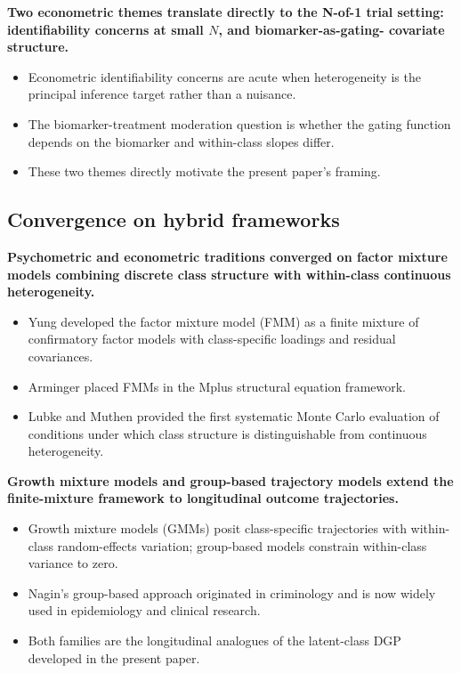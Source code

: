 \documentclass[
  11pt,
]{article}
\begin{document}
\textbf{Two econometric themes translate directly to the N-of-1 trial
setting: identifiability concerns at small $N$, and biomarker-as-gating-
covariate structure.}

\begin{itemize}\setlength{\itemsep}{2pt}\setlength{\parskip}{0pt}
\item Econometric identifiability concerns are acute when heterogeneity
  is the principal inference target rather than a nuisance.
\item The biomarker-treatment moderation question is whether the gating
  function depends on the biomarker and within-class slopes differ.
\item These two themes directly motivate the present paper's framing.
\end{itemize}

\subsection{Convergence on hybrid frameworks}\label{convergence-on-hybrid-frameworks}

\textbf{Psychometric and econometric traditions converged on factor
mixture models combining discrete class structure with within-class
continuous heterogeneity.}

\begin{itemize}\setlength{\itemsep}{2pt}\setlength{\parskip}{0pt}
\item Yung developed the factor mixture model (FMM) as a finite mixture
  of confirmatory factor
  models with class-specific loadings and residual covariances.
\item Arminger placed FMMs in the Mplus structural equation framework.
\item Lubke and Muthen provided the first systematic Monte Carlo
  evaluation of conditions under which class structure is
  distinguishable from continuous heterogeneity.
\end{itemize}

\textbf{Growth mixture models and group-based trajectory models extend
the finite-mixture framework to longitudinal outcome trajectories.}

\begin{itemize}\setlength{\itemsep}{2pt}\setlength{\parskip}{0pt}
\item Growth mixture models (GMMs) posit class-specific trajectories
  with within-class
  random-effects variation; group-based models constrain
  within-class variance to zero.
\item Nagin's group-based approach originated in criminology and is
  now widely used in epidemiology and clinical research.
\item Both families are the longitudinal analogues of the latent-class
  DGP developed in the present paper.
\end{itemize}
\end{document}
